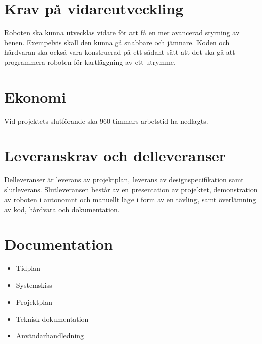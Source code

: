 \documentclass[a4paper,titlepage,12pt]{article}
\begin{document}

	\section{Krav på vidareutveckling}
	Roboten ska kunna utvecklas vidare för att få en mer avancerad styrning av benen. 
	Exempelvis skall den kunna gå snabbare och jämnare. Koden och hårdvaran ska också vara
	konstruerad på ett sådant sätt att det ska gå att programmera roboten för
	kartläggning av ett utrymme.

	\section{Ekonomi}
	Vid projektets slutförande ska 960 timmars arbetstid ha nedlagts.

	\section{Leveranskrav och delleveranser}
	Delleveranser är leverans av projektplan, leverans av designspecifikation 
	samt slutleverans. Slutleveransen består av en presentation av projektet, 
	demonstration av roboten i autonomnt och manuellt läge i form av en tävling,
	samt överlämning av kod, hårdvara och dokumentation.
	
	\section{Documentation}
    \begin{itemize}
		\item Tidplan 
		\item Systemskiss 
		\item Projektplan
		\item Teknisk dokumentation 
		\item Användarhandledning 
    \end{itemize}
\end{document}
